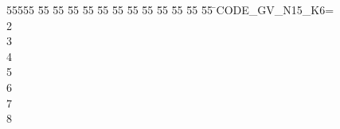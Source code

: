 %
%
\begin{tabbing}
55555 \= 55 \= 55 \= 55 \= 55 \= 55 \= 55 \= 55 \= 55 \= 55 \= 55 \= 55 \= 55 \= \>CODE\_GV\_N15\_K6=\\[0pt]
2\\[0pt]
3\\[0pt]
4\\[0pt]
5\\[0pt]
6\\[0pt]
7\\[0pt]
8\>\end{tabbing}
